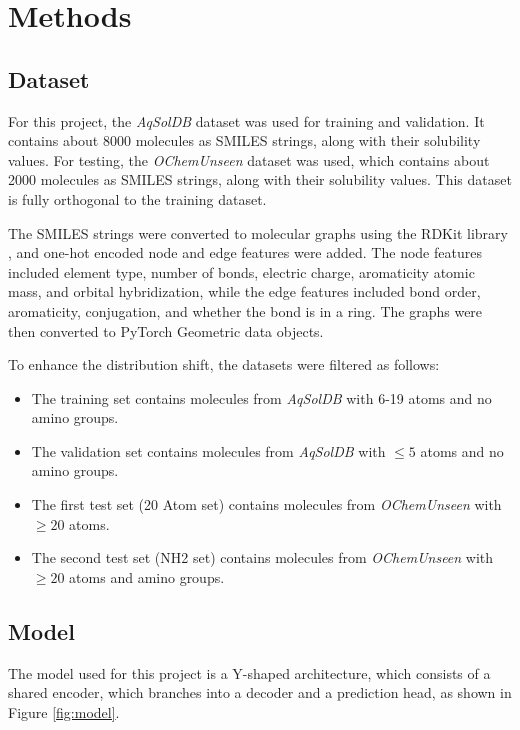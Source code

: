 \documentclass[11pt,a4paper]{article}
\begin{document}
\section{Methods}
\subsection{Dataset}

For this project, the \textit{AqSolDB} dataset \cite{llompart2024will} was used for training and validation. It contains about 8000 molecules as SMILES strings, along with their solubility values. For testing, the \textit{OChemUnseen} dataset \cite{sorkun2019aqsoldb} was used, which contains about 2000 molecules as SMILES strings, along with their solubility values. This dataset is fully orthogonal to the training dataset.

The SMILES strings were converted to molecular graphs using the RDKit library \cite{rdkit2025}, and one-hot encoded node and edge features were added. The node features included element type, number of bonds, electric charge, aromaticity atomic mass, and orbital hybridization, while the edge features included bond order, aromaticity, conjugation, and whether the bond is in a ring. The graphs were then converted to PyTorch Geometric \cite{fey2019fast} data objects.

To enhance the distribution shift, the datasets were filtered as follows:
\begin{itemize}
        \item The training set contains molecules from \textit{AqSolDB} with 6-19 atoms and no amino groups.
        \item The validation set contains molecules from \textit{AqSolDB} with $\leq 5$ atoms and no amino groups.
        \item The first test set (20 Atom set) contains molecules from \textit{OChemUnseen} with $\geq 20$ atoms.
        \item The second test set (NH2 set) contains molecules from \textit{OChemUnseen} with $\geq 20$ atoms and amino groups.
\end{itemize}

\subsection{Model}

The model used for this project is a Y-shaped architecture, which consists of a shared encoder, which branches into a decoder and a prediction head, as shown in Figure \ref{fig:model}.
\end{document}
